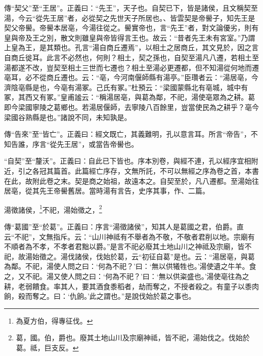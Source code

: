 {\noindent\zhuan{}\fzbyks 傳“契父”至“王居”。正義曰：“先王”，天子也。自契已下，皆是諸侯，且文稱契至湯，今云“從先王居”者，必從契之先世天子所居也。、皆雲契是帝嚳子，知先王是契父帝嚳。帝嚳本居亳，今湯往從之。嚳實帝也，言“先王”者，對文論優劣，則有皇與帝及王之別，散文則雖皇與帝皆得言王也。故云：“昔者先王未有宮室。”乃謂上皇為王，是其類也。孔言“湯自商丘遷焉”，以相土之居商丘，其文見於，因之言自商丘徙耳。此言不必然也，何則？相土，契之孫也，自契至湯凡八遷，若相土至湯都遂不改，豈契至相土三世而七遷也？相土至湯必更遷都，但不知湯從何地而遷亳耳，必不從商丘遷也。云：“亳，今河南偃師縣有湯亭。”臣瓚者云：“湯居亳，今濟陰亳縣是也，今亳有湯冢。己氏有冢。”杜預云：“梁國蒙縣北有亳城，城中有冢，其西又有冢。”皇甫謐云：“稱湯居亳，與葛為鄰，不祀，湯使亳眾為之耕。葛即今梁國寧陵之葛鄉也。若湯居偃師，去寧陵八百餘里，豈當使民為之耕乎？亳今梁國谷熟縣是也。”諸說不同，未知孰是。 \par}

{\noindent\zhuan{}\fzbyks 傳“告來”至“皆亡”。正義曰：經文既亡，其義難明，孔以意言耳。所言“帝告”，不知告誰，序言“從先王居”，或當告帝嚳也。 \par}

{\noindent\shu{}\fzkt “自契”至“釐沃”。正義曰：自此已下皆也。序本別卷，與經不連，孔以經序宜相附近，引之各冠其篇首。此篇經亡序存，文無所託，不可以無經之序為卷之首，本書在此，故附此卷之末。契是商之始祖，故遠本之。自契至於，凡八遷都。至湯始往居亳，從其先王帝嚳舊居。當時湯有言告，史序其事，作、二篇。 \par}

湯徵諸侯，\footnote{為夏方伯，得專征伐。}不祀，湯始徵之，\footnote{葛，國。伯，爵也。廢其土地山川及宗廟神祗，皆不祀，湯始伐之。伐始於葛。祗，巨支反。}

{\noindent\shu{}\fzkt 傳“葛國”至“於葛”。正義曰：序言“湯徵諸侯”，知其人是葛國之君，伯爵。直云“不祀”，文無指斥。云：“山川神祗有不舉者為不敬，不敬者君削以地。宗廟有不順者為不孝，不孝者君黜以爵。”是言不祀必廢其土地山川之神祗及宗廟，皆不祀，故湯始徵之。湯伐諸侯，伐始於葛，云“初征自葛”是也。云：“湯居亳，與葛為鄰。不祀，湯使人問之曰：‘何為不祀？’曰：‘無以供犧牲也。’湯使遺之牛羊。食之，又不祀。湯又使人問之曰：‘何為不祀？’曰：‘無以供粢盛也。’湯使亳往為之耕，老弱饋食。率其人，要其酒食黍稻者，劫而奪之，不授者殺之。有童子以黍肉餉，殺而奪之。曰：‘仇餉。’此之謂也。”是說伐始於葛之事也。 \par}

